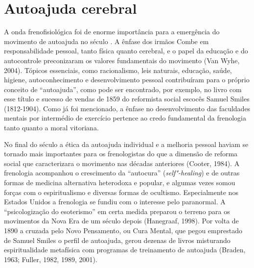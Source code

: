 \chapter{Autoajuda cerebral}

A onda frenofisiológica foi de enorme importância para a emergência do
movimento de autoajuda no século . A ênfase dos irmãos Combe em
responsabilidade pessoal, tanto física quanto cerebral, e o papel da
educação e do autocontrole preconizaram os valores fundamentais do
movimento (Van Wyhe, 2004). Tópicos essenciais, como racionalismo, leis
naturais, educação, saúde, higiene, autoconhecimento e desenvolvimento
pessoal contribuíram para o próprio conceito de ``autoajuda'', como pode
ser encontrado, por exemplo, no livro com esse título e sucesso de
vendas de 1859 do reformista social escocês Samuel Smiles (1812-1904).
Como já foi mencionado, a ênfase no desenvolvimento das faculdades
mentais por intermédio de exercício pertence ao credo fundamental da
frenologia tanto quanto a moral vitoriana.

No final do século  a ética da autoajuda individual e a melhoria
pessoal haviam se tornado mais importantes para os frenologistas do que
a dimensão de reforma social que caracterizara o movimento nas décadas
anteriores (Cooter, 1984). A frenologia acompanhou o crescimento da
``autocura'' (\emph{self"-healing}) e de outras formas de medicina
alternativa heterodoxa e popular, e algumas vezes somou forças com o
espiritualismo e diversas formas de ocultismo. Especialmente nos Estados
Unidos a frenologia se fundiu com o interesse pelo paranormal. A
``psicologização do esoterismo'' em certa medida preparou o terreno para
os movimentos da Nova Era de um século depois (Hanegraaf, 1998). Por
volta de 1890 a cruzada pelo Novo Pensamento, ou Cura Mental, que pegou
emprestado de Samuel Smiles o perfil de autoajuda, gerou dezenas de
livros misturando espiritualidade metafísica com programas de
treinamento de autoajuda (Braden, 1963; Fuller, 1982, 1989, 2001).

